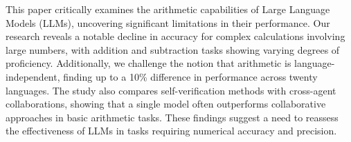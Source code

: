 This paper critically examines the arithmetic capabilities of Large Language Models (LLMs), uncovering significant limitations in their performance. Our research reveals a notable decline in accuracy for complex calculations involving large numbers, with addition and subtraction tasks showing varying degrees of proficiency. Additionally, we challenge the notion that arithmetic is language-independent, finding up to a 10\% difference in performance across twenty languages. The study also compares self-verification methods with cross-agent collaborations, showing that a single model often outperforms collaborative approaches in basic arithmetic tasks. These findings suggest a need to reassess the effectiveness of LLMs in tasks requiring numerical accuracy and precision.